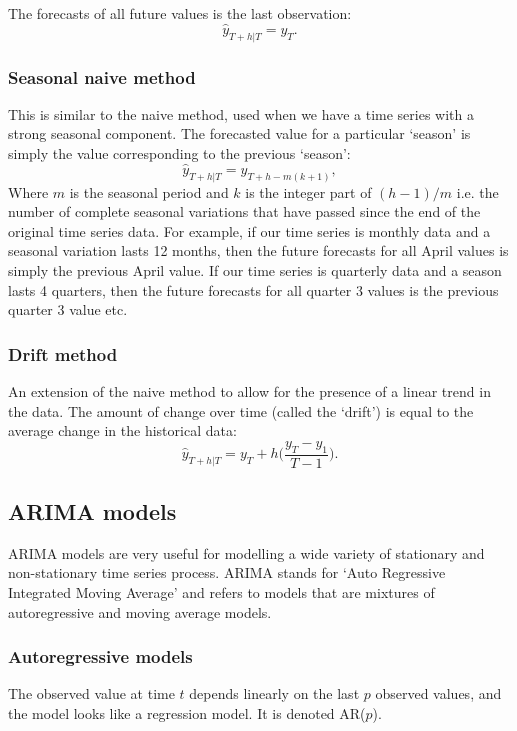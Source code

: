          The forecasts of all future values is the last observation: \[\hat{y}_{T+h|T} = y_{T}.\]

      \subsubsection{Seasonal naive method}

         This is similar to the naive method, used when we have a time series with a strong seasonal component. The forecasted value for a particular `season' is simply the value corresponding to the previous `season': \[\hat{y}_{T+h|T} = y_{T+h-m(k+1)},\]
         Where \(m\) is the seasonal period and \(k\) is the integer part of \((h-1)/m\) i.e. the number of complete seasonal variations that have passed since the end of the original time series data.
         For example, if our time series is monthly data and a seasonal variation lasts 12 months, then the future forecasts for all April values is simply the previous April value. If our time series is quarterly data and a season lasts 4 quarters, then the future forecasts for all quarter 3 values is the previous quarter 3 value etc.

      \subsubsection{Drift method}

         An extension of the naive method to allow for the presence of a linear trend in the data. The amount of change over time (called the `drift') is equal to the average change in the historical data: \[\hat{y}_{T+h|T} = y_{T} + h \Big(\frac{y_{T} - y_{1}}{T-1} \Big).\]

   \subsection{ARIMA models}

      ARIMA models are very useful for modelling a wide variety of stationary and non-stationary time series process. ARIMA stands for `Auto Regressive Integrated Moving Average' and refers to models that are mixtures of autoregressive and moving average models.

      \subsubsection{Autoregressive models}

         The observed value at time \(t\) depends linearly on the last \(p\) observed values, and the model looks like a regression model. It is denoted AR(\(p\)).

